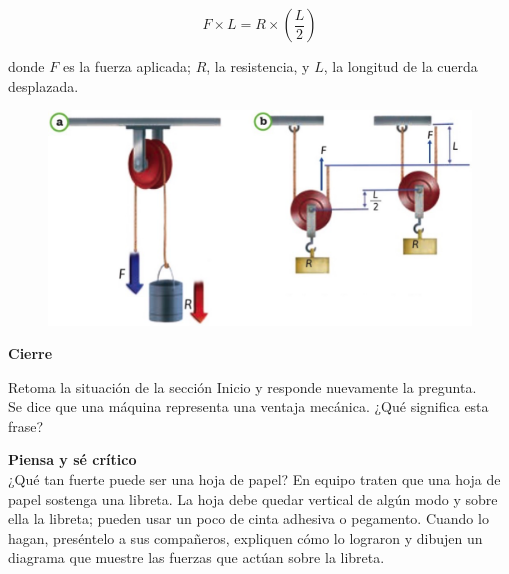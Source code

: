 \documentclass[11pt]{book}
\begin{document}
\begin{equation}
    F \times L = R \times \left(\frac{L}{2}\right)
\end{equation}

donde $F$ es la fuerza aplicada; $R$, la resistencia, y $L$, la longitud de la cuerda desplazada.

\begin{figure}[H]
    \centering
    \includegraphics[width=0.9\linewidth]{poleas_fijas.jpg}
    \label{fig:poleas_fijas}
\end{figure}


\begin{boxK}
    \begin{center}\bfseries \color{colorrds} Cierre\end{center}
    Retoma la situación de la sección Inicio y responde nuevamente la pregunta.\\
    Se dice que una máquina representa una ventaja mecánica. ¿Qué significa esta frase?
\end{boxK}


\begin{boxH}
    \textbf{Piensa y sé crítico}\\
    ¿Qué tan fuerte puede ser una hoja de papel? En equipo traten que una hoja de
    papel sostenga una libreta. La hoja debe quedar vertical de algún modo y sobre
    ella la libreta; pueden usar un poco de cinta adhesiva o pegamento. Cuando lo hagan,
    preséntelo a sus compañeros, expliquen cómo lo lograron y dibujen un diagrama que
    muestre las fuerzas que actúan sobre la libreta.
\end{boxH}
\newpage
\end{document}
